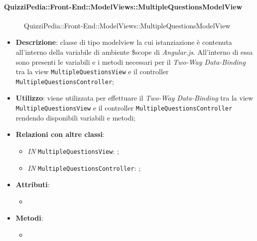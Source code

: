 \paragraph{QuizziPedia::Front-End::ModelViews::MultipleQuestionsModelView}
\begin{figure} [ht]
	\centering
	\caption{QuizziPedia::Front-End::ModelViews::MultipleQuestionsModelView}
\end{figure} \FloatBarrier
\begin{itemize}
	\item \textbf{Descrizione}: classe di tipo modelview la cui istanziazione è contenuta all'interno della variabile di ambiente \$scope di \textit{Angular.js}. All'interno di essa sono presenti le variabili e i metodi necessari per il \textit{Two-Way Data-Binding} tra la view \texttt{MultipleQuestionsView} e il controller \texttt{MultipleQuestionsController}; 
	\item \textbf{Utilizzo}: viene utilizzata per effettuare il \textit{Two-Way Data-Binding} tra la view \texttt{MultipleQuestionsView} e il controller \texttt{MultipleQuestionsController} rendendo disponibili variabili e metodi;
	\item \textbf{Relazioni con altre classi}:
	\begin{itemize}
		\item \textit{IN} \texttt{MultipleQuestionsView}: ; 
		\item \textit{IN} \texttt{MultipleQuestionsController}: ;
	\end{itemize}
	\item \textbf{Attributi}:
	\begin{itemize}
		\item
	\end{itemize}
	\item \textbf{Metodi}:
	\begin{itemize}
		\item 
	\end{itemize}
\end{itemize}

